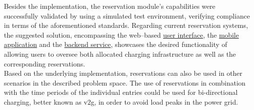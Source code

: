 Besides the implementation, the reservation module's capabilities were successfully validated by using a simulated test environment, verifying compliance in terms of the aforementioned standards.
Regarding current reservation systems, the suggested solution, encompassing the web--based \href{https://github.com/JulianHBuecher/ev-dashboard/tree/reservation-process}{user interface}, the \href{https://github.com/JulianHBuecher/ev-mobile/tree/reservation-process}{mobile application} and the \href{https://github.com/JulianHBuecher/ev-server/tree/reservation-process}{backend service}, showcases the desired functionality of allowing users to oversee both allocated charging infrastructure as well as the corresponding reservations.\\
Based on the underlying implementation, reservations can also be used in other scenarios in the described problem space. 
The use of reservations in combination with the time periods of the individual entries could be used for bi-directional charging, better known as \acrfull{v2g}, in order to avoid load peaks in the power grid.